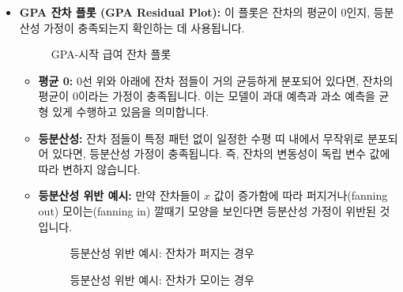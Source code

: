\documentclass[11pt,a4paper]{article}
\theoremstyle{definition}
\begin{document}
\begin{itemize}
    \item \textbf{GPA 잔차 플롯 (GPA Residual Plot):}
    이 플롯은 잔차의 평균이 0인지, 등분산성 가정이 충족되는지 확인하는 데 사용됩니다.
    \begin{figure}[h!]
        \centering
        \caption{GPA-시작 급여 잔차 플롯}
        \label{fig:gpa_salary_residual_plot}
    \end{figure}
    \begin{tcolorbox}[colback=lightblue,colframe=darkblue,title={평균 0 및 등분산성 가정 확인}]
    \begin{itemize}
        \item \textbf{평균 0:} 0선 위와 아래에 잔차 점들이 거의 균등하게 분포되어 있다면, 잔차의 평균이 0이라는 가정이 충족됩니다. 이는 모델이 과대 예측과 과소 예측을 균형 있게 수행하고 있음을 의미합니다.
        \item \textbf{등분산성:} 잔차 점들이 특정 패턴 없이 일정한 수평 띠 내에서 무작위로 분포되어 있다면, 등분산성 가정이 충족됩니다. 즉, 잔차의 변동성이 독립 변수 값에 따라 변하지 않습니다.
        \item \textbf{등분산성 위반 예시:} 만약 잔차들이 $x$ 값이 증가함에 따라 퍼지거나(fanning out) 모이는(fanning in) 깔때기 모양을 보인다면 등분산성 가정이 위반된 것입니다.
        \begin{figure}[h!]
            \centering
            \caption{등분산성 위반 예시: 잔차가 퍼지는 경우}
            \label{fig:residual_fanning_out}
        \end{figure}
        \begin{figure}[h!]
            \centering
            \caption{등분산성 위반 예시: 잔차가 모이는 경우}
            \label{fig:residual_fanning_in}
        \end{figure}
    \end{itemize}
    \end{tcolorbox}


\end{itemize}
\end{document}
